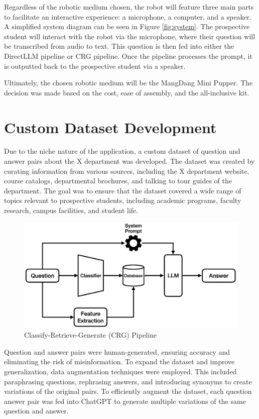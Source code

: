 \documentclass[conference]{IEEEtran}
\begin{document}
Regardless of the robotic medium chosen, the robot will feature three main parts to facilitate an interactive experience: a microphone, a computer, and a speaker. 
A simplified system diagram can be seen in Figure \ref{fig:system}. The prospective student will interact with the robot via the microphone, where their question will be transcribed from audio to text.
This question is then fed into either the DirectLLM pipeline or CRG pipeline. Once the pipeline processes the prompt, it is outputted back to the prospective student via a speaker.

Ultimately, the chosen robotic medium will be the MangDang Mini Pupper. 
The decision was made based on the cost, ease of assembly, and the all-inclusive kit.

\section{Custom Dataset Development}
Due to the niche nature of the application, a custom dataset of question and answer pairs about the X department was developed.
The dataset was created by curating information from various sources, including the X department website, course catalogs, departmental brochures, and talking to tour guides of the department. 
The goal was to ensure that the dataset covered a wide range of topics relevant to prospective students, including academic programs, faculty research, campus facilities, and student life.

\begin{figure}[t]
    \centering
    \includegraphics[width=0.60\linewidth]{assets/crg_diagram.png}
    \caption{Classify-Retrieve-Generate (CRG) Pipeline}
    \label{fig:crg_flow}
\end{figure}

Question and answer pairs were human-generated, ensuring accuracy and eliminating the risk of misinformation.
To expand the dataset and improve generalization, data augmentation techniques were employed.
This included paraphrasing questions, rephrasing answers, and introducing synonyms to create variations of the original pairs.
To efficiently augment the dataset, each question answer pair was fed into ChatGPT to generate multiple variations of the same question and answer.
\end{document}
